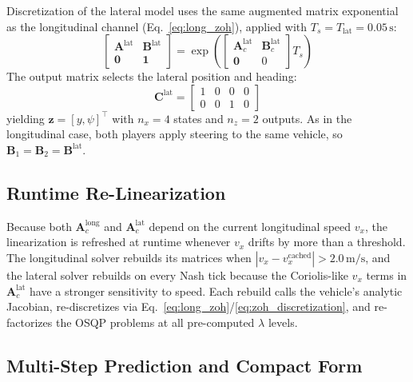 \documentclass[12pt,a4paper,oneside]{report}
\begin{document}
Discretization of the lateral model uses the same augmented matrix exponential as the longitudinal channel (Eq.~\eqref{eq:long_zoh}), applied with $T_s = T_{\text{lat}} = 0.05\,\mathrm{s}$:
\begin{equation}
\begin{bmatrix} \mathbf{A}^{\text{lat}} & \mathbf{B}^{\text{lat}} \\ \mathbf{0} & \mathbf{1} \end{bmatrix}
= \exp\!\left( \begin{bmatrix} \mathbf{A}_c^{\text{lat}} & \mathbf{B}_c^{\text{lat}} \\ \mathbf{0} & 0 \end{bmatrix} T_s \right)
\label{eq:zoh_discretization}
\end{equation}
The output matrix selects the lateral position and heading:
\begin{equation}
\mathbf{C}^{\text{lat}} = \begin{bmatrix} 1 & 0 & 0 & 0 \\ 0 & 0 & 1 & 0 \end{bmatrix}
\label{eq:C_lateral}
\end{equation}
yielding $\mathbf{z} = [y, \psi]^{\top}$ with $n_x = 4$ states and $n_z = 2$ outputs. As in the longitudinal case, both players apply steering to the same vehicle, so $\mathbf{B}_1 = \mathbf{B}_2 = \mathbf{B}^{\text{lat}}$.

\subsection{Runtime Re-Linearization}
\label{sec:relinearization}

Because both $\mathbf{A}_c^{\text{long}}$ and $\mathbf{A}_c^{\text{lat}}$ depend on the current longitudinal speed $v_x$, the linearization is refreshed at runtime whenever $v_x$ drifts by more than a threshold. The longitudinal solver rebuilds its matrices when $|v_x - v_x^{\text{cached}}| > 2.0\,\mathrm{m/s}$, and the lateral solver rebuilds on every Nash tick because the Coriolis-like $v_x$ terms in $\mathbf{A}_c^{\text{lat}}$ have a stronger sensitivity to speed. Each rebuild calls the vehicle's analytic Jacobian, re-discretizes via Eq.~\eqref{eq:long_zoh}/\eqref{eq:zoh_discretization}, and re-factorizes the OSQP problems at all pre-computed $\lambda$ levels.

\subsection{Multi-Step Prediction and Compact Form}
\end{document}
